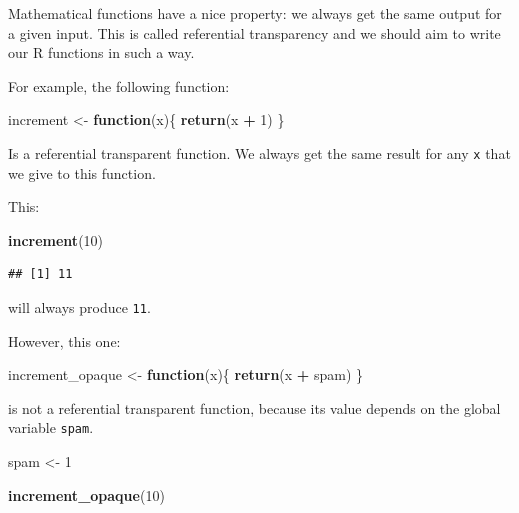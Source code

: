 \documentclass[]{gitbook}
\newenvironment{Shaded}{\begin{snugshade}}{\end{snugshade}}
\newcommand{\ControlFlowTok}[1]{\textcolor[rgb]{0.13,0.29,0.53}{\textbf{#1}}}
\newcommand{\DecValTok}[1]{\textcolor[rgb]{0.00,0.00,0.81}{#1}}
\newcommand{\KeywordTok}[1]{\textcolor[rgb]{0.13,0.29,0.53}{\textbf{#1}}}
\newcommand{\NormalTok}[1]{#1}
\newcommand{\OperatorTok}[1]{\textcolor[rgb]{0.81,0.36,0.00}{\textbf{#1}}}
\newcommand{\StringTok}[1]{\textcolor[rgb]{0.31,0.60,0.02}{#1}}
\theoremstyle{definition}
\theoremstyle{definition}
\theoremstyle{definition}
\theoremstyle{remark}
\begin{document}
Mathematical functions have a nice property: we always get the same
output for a given input. This is called referential transparency and we
should aim to write our R functions in such a way.

For example, the following function:

\begin{Shaded}
\begin{Highlighting}[]
\NormalTok{increment <-}\StringTok{ }\ControlFlowTok{function}\NormalTok{(x)\{}
    \KeywordTok{return}\NormalTok{(x }\OperatorTok{+}\StringTok{ }\DecValTok{1}\NormalTok{)}
\NormalTok{\}}
\end{Highlighting}
\end{Shaded}

Is a referential transparent function. We always get the same result for
any \texttt{x} that we give to this function.

This:

\begin{Shaded}
\begin{Highlighting}[]
\KeywordTok{increment}\NormalTok{(}\DecValTok{10}\NormalTok{)}
\end{Highlighting}
\end{Shaded}

\begin{verbatim}
## [1] 11
\end{verbatim}

will always produce \texttt{11}.

However, this one:

\begin{Shaded}
\begin{Highlighting}[]
\NormalTok{increment_opaque <-}\StringTok{ }\ControlFlowTok{function}\NormalTok{(x)\{}
    \KeywordTok{return}\NormalTok{(x }\OperatorTok{+}\StringTok{ }\NormalTok{spam)}
\NormalTok{\}}
\end{Highlighting}
\end{Shaded}

is not a referential transparent function, because its value depends on
the global variable \texttt{spam}.

\begin{Shaded}
\begin{Highlighting}[]
\NormalTok{spam <-}\StringTok{ }\DecValTok{1}

\KeywordTok{increment_opaque}\NormalTok{(}\DecValTok{10}\NormalTok{)}
\end{Highlighting}
\end{Shaded}
\end{document}
